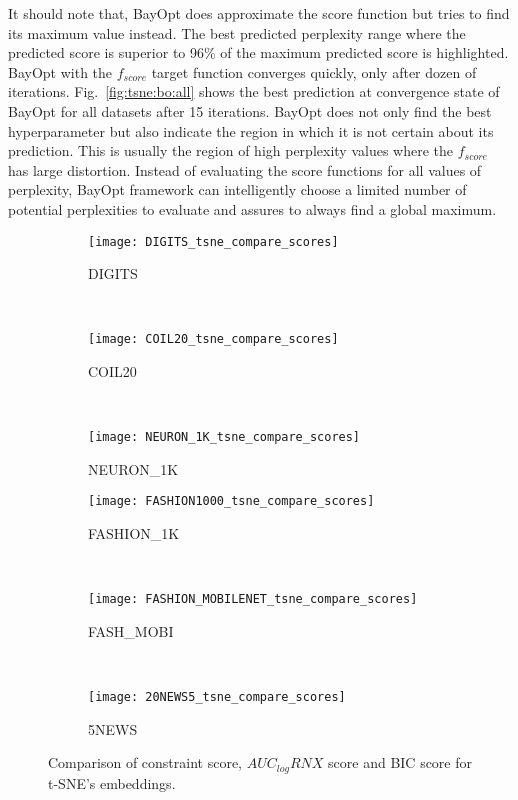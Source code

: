 It should note that, BayOpt does approximate the score function but tries to find its maximum value instead.
The best predicted perplexity range where the predicted score is superior to 96\% of the maximum predicted score is highlighted.
BayOpt with the $f_{score}$ target function converges quickly, only after dozen of iterations.
Fig.~\ref{fig:tsne:bo:all} shows the best prediction at convergence state of BayOpt for all datasets after 15 iterations.
BayOpt does not only find the best hyperparameter but also indicate the region in which it is not certain about its prediction.
This is usually the region of high perplexity values where the $f_{score}$ has large distortion.
Instead of evaluating the score functions for all values of perplexity, BayOpt framework can intelligently choose a limited number of potential perplexities to evaluate and assures to always find a global maximum.

\begin{figure}[]%
    \centering
    \begin{subfigure}[b]{0.3\linewidth}
        \centering
        \texttt{[image: DIGITS\_tsne\_compare\_scores]}
        \caption{DIGITS}
    \end{subfigure}
    ~
    \begin{subfigure}[b]{0.3\linewidth}
        \texttt{[image: COIL20\_tsne\_compare\_scores]}
        \caption{COIL20}
    \end{subfigure}
    ~
    \begin{subfigure}[b]{0.3\linewidth}
        \texttt{[image: NEURON\_1K\_tsne\_compare\_scores]}
        \caption{NEURON\_1K}
    \end{subfigure}
    \vfill
    \begin{subfigure}[b]{0.3\linewidth}
        \centering
        \texttt{[image: FASHION1000\_tsne\_compare\_scores]}
        \caption{FASHION\_1K}
    \end{subfigure}
    ~
    \begin{subfigure}[b]{0.3\linewidth}
        \texttt{[image: FASHION\_MOBILENET\_tsne\_compare\_scores]}
        \caption{FASH\_MOBI}
    \end{subfigure}
    ~
    \begin{subfigure}[b]{0.3\linewidth}
        \texttt{[image: 20NEWS5\_tsne\_compare\_scores]}
        \caption{5NEWS}
    \end{subfigure}
    \caption{Comparison of constraint score, $AUC_{log}RNX$ score and BIC score for t-SNE's embeddings.}
    \label{fig:tsne:compare}
\end{figure}

